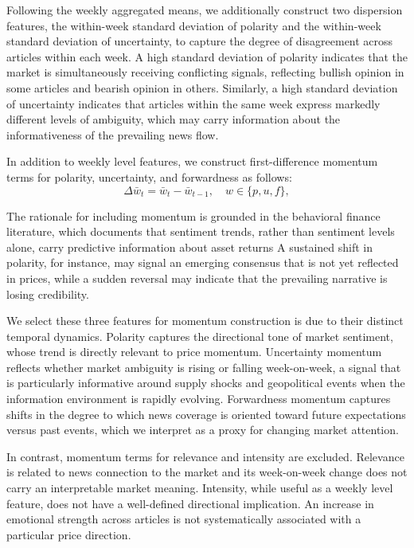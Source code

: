 \documentclass[preprint,12pt,authoryear]{elsarticle}
\begin{document}
Following the weekly aggregated means, we additionally construct two dispersion features, the within-week standard deviation of polarity and the within-week standard deviation of uncertainty, to capture the degree of disagreement across articles within each week. A high standard deviation of polarity indicates that the market is simultaneously receiving conflicting signals, reflecting bullish opinion in some articles and bearish opinion in others. Similarly, a high standard deviation of uncertainty indicates that articles within the same week express markedly different levels of ambiguity, which may carry information about the informativeness of the prevailing news flow.


In addition to weekly level features, we construct first-difference momentum terms for polarity, uncertainty, and forwardness as follows: 
\begin{equation}
    \Delta \bar{w}_{t} = \bar{w}_{t} - \bar{w}_{t-1},
    \quad w \in \{p, u, f\},
    \label{eq:momentum}
\end{equation}

The rationale for including momentum is grounded in the behavioral finance literature, which documents that sentiment trends, rather than sentiment levels alone, carry predictive information about asset returns \citep{baker2006investor,uhl2015s}
A sustained shift in polarity, for instance, may signal an emerging consensus that is not yet reflected in prices, while a sudden reversal may indicate that the prevailing narrative is losing credibility.

We select these three features for momentum construction is due to their distinct temporal dynamics. Polarity captures the directional tone of market sentiment, whose trend is directly relevant to price momentum. Uncertainty momentum reflects whether market ambiguity is rising or falling week-on-week, a signal that is particularly informative around supply shocks and geopolitical events when the information environment is rapidly evolving. Forwardness momentum captures shifts in the degree to which news coverage is oriented toward future expectations versus past events, which we interpret as a proxy for changing market attention. 

In contrast, momentum terms for relevance and intensity are excluded. Relevance is related to news connection to the market and its week-on-week change does not carry an interpretable market meaning. Intensity, while useful as a weekly level feature, does not have a well-defined directional implication. An  increase in emotional strength across articles is not systematically associated with a particular price direction. 
\end{document}
